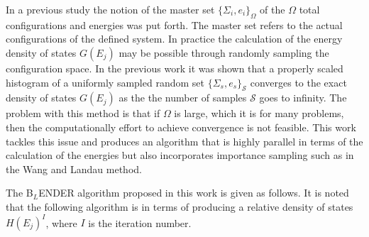 \documentclass[aps,prl,reprint,superscriptaddress,showkeys]{revtex4-1}
\begin{document}
  In a previous study\cite{partition} the notion of the master set $\{ \Sigma_i, e_i \}_\Omega $ of the $\Omega$ total configurations and energies was put forth. The master set refers to the actual configurations of the defined system. In practice the calculation of the energy density of states $G(E_j)$  may  be possible through randomly sampling the configuration space.  In the previous work\cite{partition} it was shown that a properly scaled histogram of a uniformly sampled random set $\{ \Sigma_s, e_s \}_\mathcal{S}$ converges to the exact density of states $G(E_j)$ as the the number of samples $\mathcal{S}$ goes to infinity. The problem with this method is that if $\Omega$ is large, which it is for many problems,  then the computationally effort to achieve convergence is not feasible.  This work tackles this issue and produces an algorithm that is highly parallel in terms of the calculation of the energies  but also incorporates importance sampling such as in the Wang and Landau method.
   
The B$_{L}$ENDER algorithm proposed in this work  is given as follows. It is noted that the following algorithm is in terms of producing a relative density of states $H(E_j)^I$, where $I$ is the iteration number. 
\end{document}

